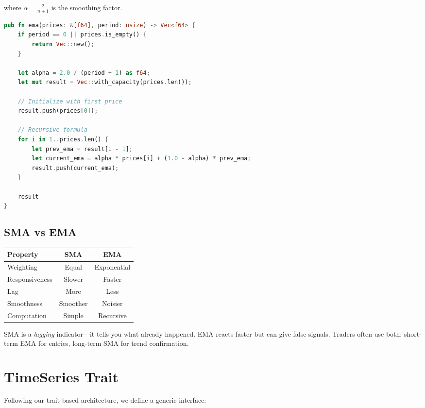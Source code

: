 where $\alpha = \frac{2}{n+1}$ is the smoothing factor.

\begin{lstlisting}[language=Rust]
pub fn ema(prices: &[f64], period: usize) -> Vec<f64> {
    if period == 0 || prices.is_empty() {
        return Vec::new();
    }

    let alpha = 2.0 / (period + 1) as f64;
    let mut result = Vec::with_capacity(prices.len());

    // Initialize with first price
    result.push(prices[0]);

    // Recursive formula
    for i in 1..prices.len() {
        let prev_ema = result[i - 1];
        let current_ema = alpha * prices[i] + (1.0 - alpha) * prev_ema;
        result.push(current_ema);
    }

    result
}
\end{lstlisting}

\subsection{SMA vs EMA}

\begin{center}
\begin{tabular}{lcc}
\toprule
\textbf{Property} & \textbf{SMA} & \textbf{EMA} \\
\midrule
Weighting & Equal & Exponential \\
Responsiveness & Slower & Faster \\
Lag & More & Less \\
Smoothness & Smoother & Noisier \\
Computation & Simple & Recursive \\
\bottomrule
\end{tabular}
\end{center}

\begin{keyinsight}
SMA is a \emph{lagging} indicator---it tells you what already happened. EMA
reacts faster but can give false signals. Traders often use both: short-term
EMA for entries, long-term SMA for trend confirmation.
\end{keyinsight}

\section{TimeSeries Trait}

Following our trait-based architecture, we define a generic interface:

